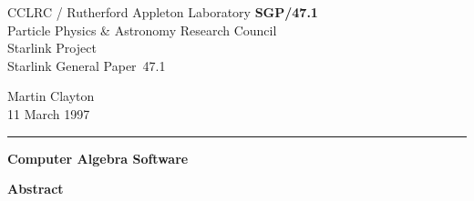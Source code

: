 \documentclass[twoside,11pt]{article}
\newcommand{\stardoccategory}  {Starlink General Paper}
\newcommand{\stardocinitials}  {SGP}
\newcommand{\stardocnumber}    {47.1}
\newcommand{\stardocauthors}   {Martin Clayton}
\newcommand{\stardocdate}      {11 March 1997}
\newcommand{\stardoctitle}     {Computer Algebra Software}
\newcommand{\stardocname}{\stardocinitials /\stardocnumber}
\newenvironment{latexonly}{}{}
\begin{document}
\thispagestyle{empty}

\begin{latexonly}
   CCLRC / {\sc Rutherford Appleton Laboratory} \hfill {\bf \stardocname}\\
   {\large Particle Physics \& Astronomy Research Council}\\
   {\large Starlink Project\\}
   {\large \stardoccategory\ \stardocnumber}
   \begin{flushright}
   \stardocauthors\\
   \stardocdate
   \end{flushright}
   \vspace{-4mm}
   \rule{\textwidth}{0.5mm}
   \vspace{5mm}
   \begin{center}
   {\Large\bf \stardoctitle}
   \end{center}
   \vspace{5mm}

   \vspace{10mm}
   \begin{center}
      {\Large\bf Abstract}
   \end{center}
\end{latexonly}
\end{document}
